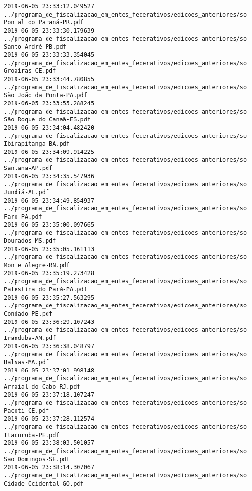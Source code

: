 \begin{lstlisting}
2019-06-05 23:33:12.049527 ../programa_de_fiscalizacao_em_entes_federativos/edicoes_anteriores/sorteio_36/2483-Pontal do Paraná-PR.pdf
2019-06-05 23:33:30.179639 ../programa_de_fiscalizacao_em_entes_federativos/edicoes_anteriores/sorteio_36/2497-Santo André-PB.pdf
2019-06-05 23:33:33.354045 ../programa_de_fiscalizacao_em_entes_federativos/edicoes_anteriores/sorteio_36/2487-Groaíras-CE.pdf
2019-06-05 23:33:44.780855 ../programa_de_fiscalizacao_em_entes_federativos/edicoes_anteriores/sorteio_36/2455-São João da Ponta-PA.pdf
2019-06-05 23:33:55.288245 ../programa_de_fiscalizacao_em_entes_federativos/edicoes_anteriores/sorteio_36/2499-São Roque do Canaã-ES.pdf
2019-06-05 23:34:04.482420 ../programa_de_fiscalizacao_em_entes_federativos/edicoes_anteriores/sorteio_36/2495-Ibirapitanga-BA.pdf
2019-06-05 23:34:09.914225 ../programa_de_fiscalizacao_em_entes_federativos/edicoes_anteriores/sorteio_36/2463-Santana-AP.pdf
2019-06-05 23:34:35.547936 ../programa_de_fiscalizacao_em_entes_federativos/edicoes_anteriores/sorteio_36/2475-Jundiá-AL.pdf
2019-06-05 23:34:49.854937 ../programa_de_fiscalizacao_em_entes_federativos/edicoes_anteriores/sorteio_36/2473-Faro-PA.pdf
2019-06-05 23:35:00.097665 ../programa_de_fiscalizacao_em_entes_federativos/edicoes_anteriores/sorteio_36/2471-Dourados-MS.pdf
2019-06-05 23:35:05.161113 ../programa_de_fiscalizacao_em_entes_federativos/edicoes_anteriores/sorteio_36/2469-Monte Alegre-RN.pdf
2019-06-05 23:35:19.273428 ../programa_de_fiscalizacao_em_entes_federativos/edicoes_anteriores/sorteio_36/2457-Palestina do Pará-PA.pdf
2019-06-05 23:35:27.563295 ../programa_de_fiscalizacao_em_entes_federativos/edicoes_anteriores/sorteio_36/2479-Condado-PE.pdf
2019-06-05 23:36:29.107243 ../programa_de_fiscalizacao_em_entes_federativos/edicoes_anteriores/sorteio_36/2481-Iranduba-AM.pdf
2019-06-05 23:36:38.048797 ../programa_de_fiscalizacao_em_entes_federativos/edicoes_anteriores/sorteio_36/2465-Balsas-MA.pdf
2019-06-05 23:37:01.998148 ../programa_de_fiscalizacao_em_entes_federativos/edicoes_anteriores/sorteio_36/2493-Arraial do Cabo-RJ.pdf
2019-06-05 23:37:18.107247 ../programa_de_fiscalizacao_em_entes_federativos/edicoes_anteriores/sorteio_36/2501-Pacoti-CE.pdf
2019-06-05 23:37:28.112574 ../programa_de_fiscalizacao_em_entes_federativos/edicoes_anteriores/sorteio_36/2461-Itacuruba-PE.pdf
2019-06-05 23:38:03.501057 ../programa_de_fiscalizacao_em_entes_federativos/edicoes_anteriores/sorteio_37/2781-São Domingos-SE.pdf
2019-06-05 23:38:14.307067 ../programa_de_fiscalizacao_em_entes_federativos/edicoes_anteriores/sorteio_37/2795-Cidade Ocidental-GO.pdf

\end{lstlisting}
